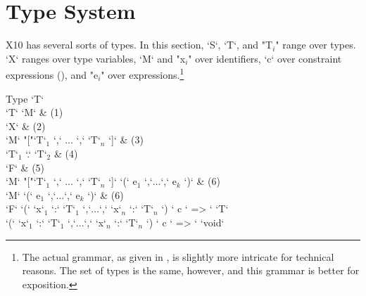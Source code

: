 \section{Type System}



X10 has several sorts of types. 
In this section, \xcd`S`, \xcd`T`, and 
\xcdmath"T$_i$" range over types.  \xcd`X` ranges over type variables, 
\xcd`M` and \xcdmath"x$_i$" over identifiers, 
\xcd`c` over constraint expressions (), 
and \xcdmath"e$_i$" over expressions.\footnote{The actual grammar, as given in 
, is slightly more intricate for technical reasons.  
The set of types is the same, however, and this grammar is better for
exposition.} 


\begin{bbgrammar}
Type \: \xcd`T` \\
\xcd`T` \: \xcd`M`  & (1)\\
  \: \xcd`X` & (2) \\
  \: \xcd`M` \xcd"["\xcd`T`$_1$ \xcd`,` $\ldots$ \xcd`,` \xcd`T`$_n$ \xcd`]` & (3)\\
  \: \xcd`T`$_1$  \xcd`.` \xcd`T`$_2$ & (4)\\
  \: \xcd`F` & (5)\\
  \: \xcd`M` \xcd"["\xcd`T`$_1$ \xcd`,` $\ldots$ \xcd`,` \xcd`T`$_n$ \xcd`]` 
       \xcd`(` e$_1$ \xcd`,`$\ldots$\xcd`,` e$_k$ \xcd`)` & (6) \\
  \: \xcd`M` 
       \xcd`(` e$_1$ \xcd`,`$\ldots$\xcd`,` e$_k$ \xcd`)` & (6) \\
\xcd`F` \: \xcd`(` \xcd`x`$_1$ \xcd`:` \xcd`T`$_1$ \xcd`,`$\ldots$\xcd`,`
             \xcd`x`$_n$ \xcd`:` \xcd`T`$_n$ \xcd`) {` c  \xcd`} => ` \xcd`T` \\

  \: \xcd`(` \xcd`x`$_1$ \xcd`:` \xcd`T`$_1$ \xcd`,`$\ldots$\xcd`,`
             \xcd`x`$_n$ \xcd`:` \xcd`T`$_n$ \xcd`) {` c  \xcd`} => ` \xcd`void` 
\end{bbgrammar}

